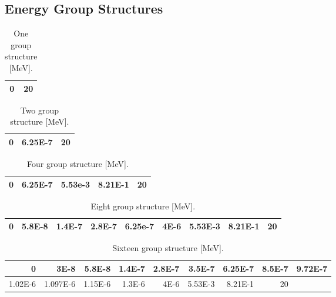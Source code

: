 \begin{appendices}

\chapter{Energy Group Structures}
\label{app:energy-groups}


\begin{table}[h!]
  \centering
  \footnotesize
  \caption{One group structure [MeV].}
  \label{table:app-1-groups} 
  \vspace{14pt}
  \begin{tabular}{r|r}
    \toprule
    0 & 20 \\
    \bottomrule
   \end{tabular}
\end{table}

\begin{table}[h!]
  \centering
  \footnotesize
  \caption{Two group structure [MeV].}
  \label{table:app-2-groups} 
  \vspace{14pt}
  \begin{tabular}{r|r|r}
  \toprule
  0 & 6.25E-7 & 20 \\
  \bottomrule
 \end{tabular}
\end{table}

\begin{table}[h!]
  \centering
  \footnotesize
  \caption{Four group structure [MeV].}
  \label{table:app-4-groups} 
  \vspace{14pt}
  \begin{tabular}{r|r|r|r|r}
  \toprule
  0 & 6.25E-7 & 5.53e-3 & 8.21E-1 & 20 \\
  \bottomrule
 \end{tabular}
\end{table}

\begin{table}[h!]
  \centering
  \footnotesize
  \caption{Eight group structure [MeV].}
  \label{table:app-8-groups} 
  \vspace{14pt}
  \begin{tabular}{r|r|r|r|r|r|r|r|r}
  \toprule
  0 & 5.8E-8 & 1.4E-7 & 2.8E-7 & 6.25e-7 & 4E-6 & 5.53E-3 & 8.21E-1 & 20 \\
  \bottomrule
 \end{tabular}
\end{table}

\begin{table}[h!]
  \centering
  \footnotesize
  \caption{Sixteen group structure [MeV].}
  \label{table:app-16-groups} 
  \vspace{14pt}
  \begin{tabular}{r|r|r|r|r|r|r|r|r}
  \toprule
  0 & 3E-8 & 5.8E-8 & 1.4E-7 & 2.8E-7 & 3.5E-7 & 6.25E-7 & 8.5E-7 & 9.72E-7 \\
  \midrule
  1.02E-6 & 1.097E-6 & 1.15E-6 & 1.3E-6 & 4E-6 & 5.53E-3 & 8.21E-1 & 20 \\
  \bottomrule
 \end{tabular}
\end{table}


\end{appendices}

